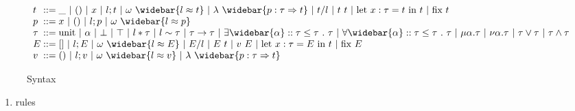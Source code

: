 \documentclass[sigplan,screen]{acmart}
\begin{document}
\begin{figure*}[h]
  \[
    \begin{array}{l @{} l}
      t 
      &{} ::=
      \begin{array}[t]{@{} l}
        \_ 
        \ |\ 
        () 
        \ |\ 
        x
        \ |\ 
        l;t 
        \ |\ 
        \omega\ \widebar{l \approx t}
        \ |\ 
        \lambda\ \widebar{p : \tau \Rightarrow t} 
        \ |\ 
        t/l
        \ |\ 
        t\ t
        \ |\ 
        \text{let } x : \tau = t\ \text{in } t
        \ |\ 
        \text{fix } t
      \end{array}
      \\
      p 
      &{} ::=
      \begin{array}[t]{@{} l}
        x 
        \ |\ 
        () 
        \ |\ 
        l;p
        \ |\ 
        \omega\ \widebar{l \approx p}
      \end{array}
      \\
      \tau
      &{} ::=
      \begin{array}[t]{@{} l}
        \text{unit} 
        \ |\ 
        \alpha 
        \ |\ 
        \bot 
        \ |\ 
        \top 
        \ |\ 
        l*\tau 
        \ |\ 
        l\sim\tau 
        \ |\ 
        \tau\rightarrow\tau 
        \ |\ 
        \exists \widebar{\alpha} :: \tau \leq \tau \ .\ \tau 
        \ |\ 
        \forall \widebar{\alpha} :: \tau \leq \tau \ .\ \tau 
        \ |\ 
        \mu \alpha.\tau 
        \ |\ 
        \nu \alpha.\tau 
        \ |\ 
        \tau \vee \tau
        \ |\ 
        \tau \wedge \tau
      \end{array}
      \\
      E 
      &{} ::=
      []
      \ |\ 
      l;E 
      \ |\ 
      \omega\ \widebar{l \approx E}
      \ |\ 
      E/l
      \ |\ 
      E\ t
      \ |\ 
      v\ E
      \ |\ 
      \text{let } x : \tau = E\ \text{in } t
      \ |\ 
      \text{fix } E 
      \\
      v 
      &{} ::=
      \begin{array}[t]{@{} l}
        () 
        \ |\ 
        l;v
        \ |\ 
        \omega\ \widebar{l \approx v}
        \ |\ 
        \lambda\ \widebar{p : \tau \Rightarrow t} 
      \end{array}
    \end{array}
  \]
  \caption{Syntax}
\end{figure*}






\begin{enumerate}
  \item rules 
\end{enumerate}
\end{document}
